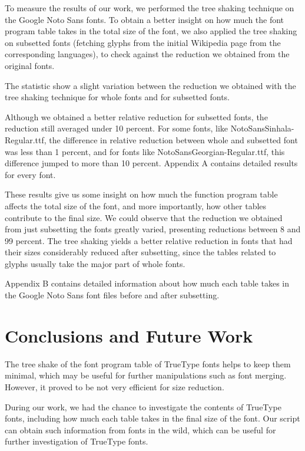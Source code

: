 \documentclass[12pt]{article}
\begin{document}
To measure the results of our work, we performed the tree shaking
technique on the Google Noto Sans fonts\cite{notosans}. To obtain a
better insight on how much the font program table takes in the total
size of the font, we also applied the tree shaking on subsetted fonts
(fetching glyphs from the initial Wikipedia page from the corresponding
languages), to check against the reduction we obtained from the original
fonts.



The statistic show a slight variation between the reduction we obtained
with the tree shaking technique for whole fonts and for subsetted fonts.

Although we obtained a better relative reduction for subsetted fonts, the
reduction still averaged under 10 percent. For some fonts, like
NotoSansSinhala-Regular.ttf, the difference in relative reduction
between whole and subsetted font was less than 1 percent, and for fonts
like NotoSansGeorgian-Regular.ttf, this difference jumped to more than
10 percent. Appendix A contains detailed results for every font.

These results give us some insight on how much the function program
table affects the total size of the font, and more importantly, how
other tables contribute to the final size. We could observe that the
reduction we obtained from just subsetting the fonts greatly
varied, presenting reductions between 8 and 99 percent. The tree shaking
yields a better relative reduction in fonts that had their sizes
considerably reduced after subsetting, since the tables related to
glyphs usually take the major part of whole fonts.

Appendix B contains detailed information about how much each table takes
in the Google Noto Sans font files before and after subsetting.

\section{Conclusions and Future Work}

The tree shake of the font program table of TrueType fonts helps to keep
them minimal, which may be useful for further manipulations such as
font merging. However, it proved to be not very efficient for size
reduction.

During our work, we had the chance to investigate the contents
of TrueType fonts, including how much each table takes in the final size
of the font. Our script can obtain such information from fonts in the
wild, which can be useful for further investigation of TrueType fonts.
\end{document}
